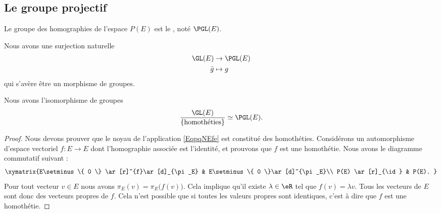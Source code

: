 \subsection{Le groupe projectif}

\begin{definition}      \label{DEFooWUSDooSLVKwV}
    Le groupe des homographies de l'espace \( P(E)\) est le , noté \( \PGL(E)\).
\end{definition}

Nous avons une surjection naturelle
\begin{equation}        \label{EqpqNEfe}
    \begin{aligned}
         \GL(E)&\to \PGL(E) \\
        \bar g&\mapsto g 
    \end{aligned}
\end{equation}
qui s'avère être un morphisme de groupes.

\begin{proposition}
    Nous avons l'isomorphisme de groupes
    \begin{equation}
        \frac{ \GL(E) }{\{  \text{homothéties} \}}\simeq \PGL(E).
    \end{equation}
    
\end{proposition}

\begin{proof}
    Nous devons prouver que le noyau de l'application \eqref{EqpqNEfe} est constitué des homothéties. Considérons un automorphisme d'espace vectoriel \( f\colon E\to E\) dont l'homographie associée est l'identité, et prouvons que \( f\) est une homothétie. Nous avons le diagramme commutatif suivant :
    \begin{equation}
        \xymatrix{%
        E\setminus\{ 0 \} \ar[r]^{f}\ar[d]_{\pi_E}        &   E\setminus\{ 0 \}\ar[d]^{\pi_E}\\
           P(E) \ar[r]_{\id}   &   P(E).
           }
    \end{equation}
    Pour tout vecteur \( v\in E\) nous avons \( \pi_E(v)=\pi_E\big( f(v) \big)\). Cela implique qu'il existe \( \lambda\in\eR\) tel que \( f(v)=\lambda v\). Tous les vecteurs de \( E\) sont donc des vecteurs propres de \( f\). Cela n'est possible que si toutes les valeurs propres sont identiques, c'est à dire que \( f\) est une homothétie.
\end{proof}

